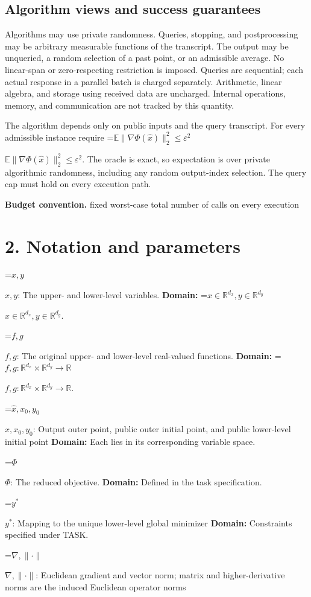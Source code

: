 \documentclass[10pt,a4paper]{article}
\newcommand{\AtlasMath}[1]{\par\begingroup\centering\setbox0=\hbox{$\displaystyle #1$}\ifdim\wd0>1.4\linewidth\typeout{ATLAS WIDE FORMULA: \the\wd0}\fi\ifdim\wd0>\linewidth\resizebox{\linewidth}{!}{\box0}\else\box0\fi\par\endgroup}
\newcommand{\AtlasInlineMath}[1]{\begingroup\setbox0=\hbox{$#1$}\ifdim\wd0>.4\linewidth\endgroup\AtlasMath{#1}\else\endgroup$#1$\fi}
\begin{document}
\subsection{Algorithm views and success guarantees}
Algorithms may use private randomness. Queries, stopping, and postprocessing may be arbitrary measurable functions of the transcript. The output may be unqueried, a random selection of a past point, or an admissible average. No linear-span or zero-respecting restriction is imposed. Queries are sequential; each actual response in a parallel batch is charged separately. Arithmetic, linear algebra, and storage using received data are uncharged. Internal operations, memory, and communication are not tracked by this quantity.

The algorithm depends only on public inputs and the query transcript. For every admissible instance require \AtlasInlineMath{\mathbb E\|\nabla\Phi(\widehat x)\|_2^2\le\varepsilon^2}. The oracle is exact, so expectation is over private algorithmic randomness, including any random output-index selection. The query cap must hold on every execution path.

\textbf{Budget convention.} fixed worst-case total number of calls on every execution

\section{2. Notation and parameters}
\AtlasInlineMath{x,y}: The upper- and lower-level variables. \textbf{Domain:} \AtlasInlineMath{x\in\mathbb R^{d_x},y\in\mathbb R^{d_y}}.

\AtlasInlineMath{f,g}: The original upper- and lower-level real-valued functions. \textbf{Domain:} \AtlasInlineMath{f,g:\mathbb R^{d_x}\times\mathbb R^{d_y}\to\mathbb R}.

\AtlasInlineMath{\widehat x,x_0,y_0}: Output outer point, public outer initial point, and public lower-level initial point \textbf{Domain:} Each lies in its corresponding variable space.

\AtlasInlineMath{\Phi}: The reduced objective. \textbf{Domain:} Defined in the task specification.

\AtlasInlineMath{y^*}: Mapping to the unique lower-level global minimizer \textbf{Domain:} Constraints specified under TASK.

\AtlasInlineMath{\nabla,\|\cdot\|}: Euclidean gradient and vector norm; matrix and higher-derivative norms are the induced Euclidean operator norms
\end{document}
